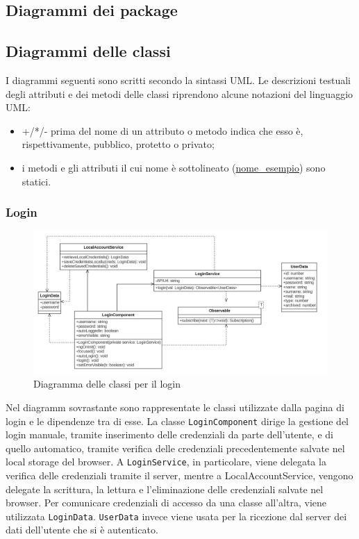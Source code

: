\subsection{Diagrammi dei package}
\subsection{Diagrammi delle classi}
I diagrammi seguenti sono scritti secondo la sintassi UML. Le descrizioni testuali degli attributi e dei metodi delle classi riprendono alcune notazioni del linguaggio UML:
\begin{itemize}
	\item +/*/- prima del nome di un attributo o metodo indica che esso è, rispettivamente, pubblico, protetto o privato;
	\item i metodi e gli attributi il cui nome è sottolineato (\underline{nome\_esempio}) sono statici.
\end{itemize}
\subsubsection{Login}
\begin{figure}[H]
	\centering
	\includegraphics[width=18cm]{res/images/webapp-login-diagrammaClassi.png}
	\caption{Diagramma delle classi per il login}
	\label{fig:DiagrammaClassiLogin}
\end{figure}
Nel diagramm sovrastante sono rappresentate le classi utilizzate dalla pagina di login e le dipendenze tra di esse. La classe \texttt{LoginComponent} dirige la gestione del login manuale, tramite inserimento delle credenziali da parte dell'utente, e di quello automatico, tramite verifica delle credenziali precedentemente salvate nel local storage del browser. A \texttt{LoginService}, in particolare, viene delegata la verifica delle credenziali tramite il server, mentre a LocalAccountService, vengono delegate la scrittura, la lettura e l'eliminazione delle credenziali salvate nel browser. Per comunicare credenziali di accesso da una classe all'altra, viene utilizzata \texttt{LoginData}. \texttt{UserData} invece viene usata per la ricezione dal server dei dati dell'utente che si è autenticato.

